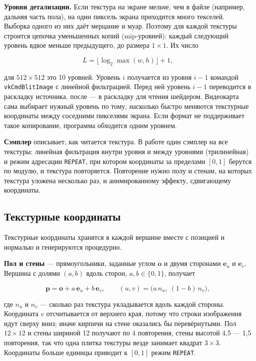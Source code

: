 \documentclass[14pt,a4paper]{extarticle}
\begin{document}
\textbf{Уровни детализации.} Если текстура на экране мельче, чем в файле
(например, дальняя часть пола), на один пиксель экрана приходится много
текселей. Выборка одного из них даёт мерцание и муар. Поэтому для каждой
текстуры строится цепочка уменьшенных копий (mip-уровней): каждый следующий
уровень вдвое меньше предыдущего, до размера $1 \times 1$. Их число

\begin{equation}
	L = \bigl\lfloor \log_2 \max(w, h) \bigr\rfloor + 1,
\end{equation}

для $512 \times 512$ это 10 уровней. Уровень $i$ получается из уровня $i - 1$
командой \texttt{vkCmdBlitImage} с линейной фильтрацией. Перед ней уровень
$i - 1$ переводится в раскладку источника, после — в раскладку для чтения
шейдером. Видеокарта сама выбирает нужный уровень по тому, насколько быстро
меняются текстурные координаты между соседними пикселями экрана. Если формат
не поддерживает такое копирование, программа обходится одним уровнем.

\textbf{Сэмплер} описывает, как читается текстура. В работе один сэмплер на
все текстуры: линейная фильтрация внутри уровня и между уровнями
(трилинейная) и режим адресации \texttt{REPEAT}, при котором координаты за
пределами $[0, 1]$ берутся по модулю, и текстура повторяется. Повторение
нужно полу и стенам, на которых текстура уложена несколько раз, и
анимированному эффекту, сдвигающему координаты.

\subsection{Текстурные координаты}

Текстурные координаты хранятся в каждой вершине вместе с позицией и нормалью
и генерируются процедурно.

\textbf{Пол и стены} — прямоугольники, заданные углом $\mathbf{o}$ и двумя
сторонами $\mathbf{e}_u$ и $\mathbf{e}_v$. Вершина с долями $(a, b)$ вдоль
сторон, $a, b \in \{0, 1\}$, получает

\begin{equation}
	\mathbf{p} = \mathbf{o} + a\,\mathbf{e}_u + b\,\mathbf{e}_v, \qquad
	(u, v) = \bigl(a\,n_u,\ (1 - b)\,n_v\bigr),
\end{equation}

где $n_u$ и $n_v$ — сколько раз текстура укладывается вдоль каждой стороны.
Координата $v$ отсчитывается от верхнего края, потому что строки изображения
идут сверху вниз; иначе кирпичи на стене оказались бы перевёрнутыми. Пол
$12 \times 12$ и стены шириной 12 получают по 4 повторения, стены высотой 4,5
— 1,5 повторения, так что одна плитка текстуры везде занимает квадрат
$3 \times 3$. Координаты больше единицы приводит к $[0, 1]$ режим
\texttt{REPEAT}.
\end{document}
